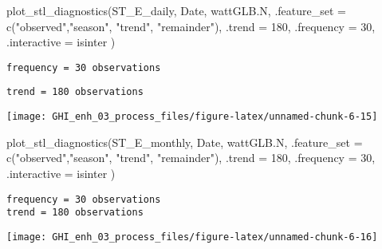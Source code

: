 \documentclass[
  10pt,
  a4paper,oneside]{article}
\newenvironment{Shaded}{\begin{snugshade}}{\end{snugshade}}
\newcommand{\AttributeTok}[1]{\textcolor[rgb]{0.77,0.63,0.00}{#1}}
\newcommand{\DecValTok}[1]{\textcolor[rgb]{0.00,0.00,0.81}{#1}}
\newcommand{\FunctionTok}[1]{\textcolor[rgb]{0.00,0.00,0.00}{#1}}
\newcommand{\NormalTok}[1]{#1}
\newcommand{\StringTok}[1]{\textcolor[rgb]{0.31,0.60,0.02}{#1}}
\begin{document}
\begin{Shaded}
\begin{Highlighting}[]
\FunctionTok{plot\_stl\_diagnostics}\NormalTok{(ST\_E\_daily, Date, wattGLB.N,}
                     \AttributeTok{.feature\_set =} \FunctionTok{c}\NormalTok{(}\StringTok{"observed"}\NormalTok{,}\StringTok{"season"}\NormalTok{, }\StringTok{"trend"}\NormalTok{, }\StringTok{"remainder"}\NormalTok{),}
                     \AttributeTok{.trend =} \DecValTok{180}\NormalTok{,}
                     \AttributeTok{.frequency =} \DecValTok{30}\NormalTok{,}
                     \AttributeTok{.interactive =}\NormalTok{ isinter}
\NormalTok{                     )}
\end{Highlighting}
\end{Shaded}

\begin{verbatim}
frequency = 30 observations
\end{verbatim}

\begin{verbatim}
trend = 180 observations
\end{verbatim}

\begin{center}\texttt{[image: GHI\_enh\_03\_process\_files/figure-latex/unnamed-chunk-6-15]} \end{center}

\begin{Shaded}
\begin{Highlighting}[]
\FunctionTok{plot\_stl\_diagnostics}\NormalTok{(ST\_E\_monthly, Date, wattGLB.N,}
                     \AttributeTok{.feature\_set =} \FunctionTok{c}\NormalTok{(}\StringTok{"observed"}\NormalTok{,}\StringTok{"season"}\NormalTok{, }\StringTok{"trend"}\NormalTok{, }\StringTok{"remainder"}\NormalTok{),}
                     \AttributeTok{.trend =} \DecValTok{180}\NormalTok{,}
                     \AttributeTok{.frequency =} \DecValTok{30}\NormalTok{,}
                     \AttributeTok{.interactive =}\NormalTok{ isinter}
\NormalTok{                     )}
\end{Highlighting}
\end{Shaded}

\begin{verbatim}
frequency = 30 observations
trend = 180 observations
\end{verbatim}

\begin{center}\texttt{[image: GHI\_enh\_03\_process\_files/figure-latex/unnamed-chunk-6-16]} \end{center}
\end{document}
